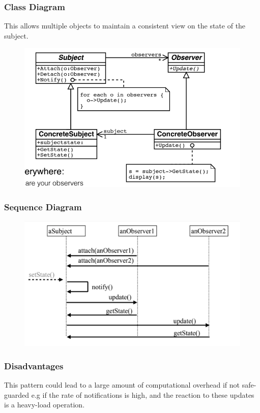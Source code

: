 \documentclass{article}
\begin{document}
\subsubsection*{Class Diagram}
This allows multiple objects to maintain a consistent view on the state of the subject.
\begin{figure}[H]
    \centering
    \includegraphics[width=0.6\linewidth]{Pictures/Screenshot 2023-02-05 at 12.49.04.png}
\end{figure}
\subsubsection*{Sequence Diagram}
\begin{figure}[H]
    \centering
    \includegraphics[width=0.6\linewidth]{Pictures/Screenshot 2023-02-05 at 12.49.43.png}
\end{figure}
\subsubsection*{Disadvantages}
This pattern could lead to a large amount of computational overhead if not safe-guarded e.g if the rate of notifications is high, and the reaction to these updates is a heavy-load operation.
\end{document}
